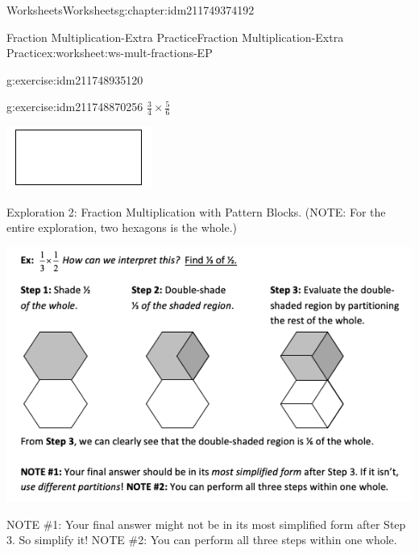 \documentclass[twoside,11pt,]{book}
\begin{document}
\begin{chapterptx}{Worksheets}{}{Worksheets}{}{}{g:chapter:idm211749374192}
\begin{worksheet-section-numberless}{Fraction Multiplication-Extra Practice}{}{Fraction Multiplication-Extra Practice}{}{}{x:worksheet:ws-mult-fractions-EP}
\begin{divisionexercise}{1}{}{}{g:exercise:idm211748935120}
\begin{sidebyside}{1}{0.2}{0.2}{0}
\end{sidebyside}%
\end{divisionexercise}%
\clearpage
\begin{divisionexercise}{2}{}{}{g:exercise:idm211748870256}%
\(\frac{3}{4} \times \frac{5}{6} \)%
\begin{sidebyside}{1}{0.2}{0.2}{0}%
\begin{sbspanel}{0.6}%
\includegraphics[width=1\linewidth]{images/generic-rectangle.png}
\end{sbspanel}%
\end{sidebyside}%
\end{divisionexercise}%
\clearpage
\begin{introduction}{}%
Exploration 2: Fraction Multiplication with Pattern Blocks. (NOTE: For the entire exploration, two hexagons is the whole.)%
\begin{sidebyside}{1}{0}{0}{0}%
\begin{sbspanel}{1}%
\includegraphics[width=1\linewidth]{images/frac-mult-pattern.png}
\end{sbspanel}%
\end{sidebyside}%
\par
NOTE \#1: Your final answer might not be in its most simplified form after Step 3. So simplify it! NOTE \#2: You can perform all three steps within one whole.%

\end{introduction}
\end{worksheet-section-numberless}
\end{chapterptx}
\end{document}
